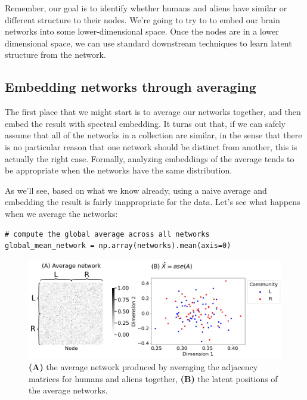 Remember, our goal is to identify whether humans and aliens have similar or different structure to their nodes. We're going to try to to embed our brain networks into some lower-dimensional space. Once the nodes are in a lower dimensional space, we can use standard downstream techniques to learn latent structure from the network.

\subsection{Embedding networks through averaging}

The first place that we might start is to average our networks together, and then embed the result with spectral embedding. It turns out that, if we can safely assume that all of the networks in a collection are similar, in the sense that there is no particular reason that one network should be distinct from another, this is actually the right case. Formally, analyzing embeddings of the average tends to be appropriate when the networks have the same distribution.

As we'll see, based on what we know already, using a naive average and embedding the result is fairly inappropriate for the data. Let's see what happens when we average the networks:

\begin{lstlisting}[style=python]
# compute the global average across all networks
global_mean_network = np.array(networks).mean(axis=0)
\end{lstlisting}

\begin{figure}[h]
    \centering
    \includegraphics[width=\linewidth]{representations/ch6/Images/multinet_avg.png}
    \caption[Average embedding]{\textbf{(A)} the average network produced by averaging the adjacency matrices for humans and aliens together, \textbf{(B)} the latent positions of the average networks.}
    \label{fig:ch6:multinet:avg}
\end{figure}


